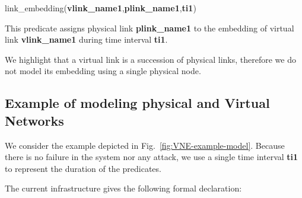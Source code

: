 \begin{myformula}
link\_embedding(\textbf{vlink\_name1},\textbf{plink\_name1},\textbf{ti1})
\end{myformula}

This predicate assigns physical link \textbf{plink\_name1} to the embedding of virtual link \textbf{vlink\_name1} during time interval \textbf{ti1}.

We highlight that a virtual link is a succession of physical links, therefore we do not model its embedding using a single physical node.


\subsection{Example of modeling physical and Virtual Networks}

We consider the example depicted in Fig.~\ref{fig:VNE-example-model}.
Because there is no failure in the system nor any attack, we use a single time interval \textbf{ti1} to represent the duration of the predicates.



The current infrastructure gives the following formal declaration:

